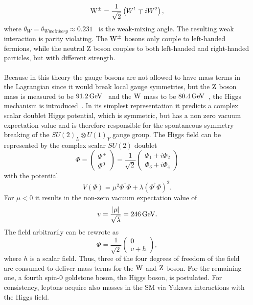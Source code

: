 \begin{equation}
 \mathrm{W}^\pm = \frac{1}{\sqrt{2}}\left(W^1\mp i W^2\right),
\end{equation}
where $\theta_W=\theta_{Wweinberg}\approx0.231$~\cite{PDG} is the weak-mixing angle.
The resulting weak interaction is parity violating. The $\mathrm{W}^\pm$ bosons only couple to left-handed fermions, while the neutral Z boson couples to both left-handed and right-handed particles, but with different strength.\\
\\Because in this theory the gauge bosons are not allowed to have mass terms in the Lagrangian since it would break local gauge symmetries, but the $\mathrm{Z}$ boson mass is measured to be $91.2\,\text{Ge\hspace{-.08em}V}$~\cite{PDG} and the $\mathrm{W}$ mass to be $80.4\,\text{Ge\hspace{-.08em}V}$~\cite{PDG}, the Higgs mechanism is introduced~\cite{Higgs1,Higgs2,Higgs3}. In its simplest representation it predicts a complex scalar doublet Higgs potential, which is symmetric, but has a non zero vacuum expectation value and is therefore responsible for the spontaneous symmetry breaking of the $ SU(2)_L\otimes U(1)_Y$ gauge group. The Higgs field can be represented by the complex scalar $SU(2)$ doublet
\begin{equation}
 \Phi=
 \left(\begin{matrix}
   \Phi^{+} \\
   \Phi^0
  \end{matrix}
 \right)
 =
 \frac{1}{\sqrt{2}}
 \left(\begin{matrix}
   \Phi_1 + i \Phi_2 \\
   \Phi_3 + i\Phi_4
  \end{matrix}
 \right)
\end{equation}
with the potential
\begin{equation}
 V(\Phi)=\mu^2 \Phi^{\dagger}\Phi+\lambda\left(\Phi^{\dagger}\Phi\right)^2.
\end{equation}
For $\mu<0$ it results in the non-zero vacuum expectation value of
\begin{equation}
 v = \frac{|\mu|}{\sqrt{\lambda}}= 246\,\text{Ge\hspace{-.08em}V}.
\end{equation}
The field arbitrarily can be rewrote as
\begin{equation}
 \Phi = \frac{1}{\sqrt{2}}
 \left(\begin{matrix}
   0 \\
   v+h
  \end{matrix}
 \right),
\end{equation}
where $h$ is a scalar field. Thus, three of the four degrees of freedom of the field are consumed to deliver mass terms for the $\mathrm{W}$ and $\mathrm{Z}$ boson. For the remaining one, a fourth spin-0 goldstone boson, the Higgs boson, is postulated. For consistency, leptons acquire also masses in the SM via Yukawa interactions with the Higgs field.
